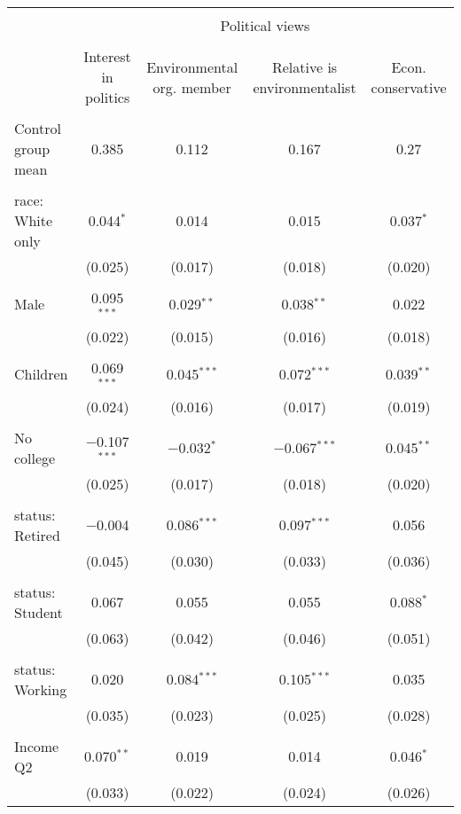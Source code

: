 
\begin{tabular}{@{\extracolsep{5pt}}lcccc} 
\\[-1.8ex]\hline 
\hline \\[-1.8ex] 
 & \multicolumn{4}{c}{Political views} \\ 
\cline{2-5} 
\\[-1.8ex] & Interest in politics & Environmental org. member & Relative is environmentalist & Econ. conservative \\ 
\hline \\[-1.8ex] 
 Control group mean & 0.385 & 0.112 & 0.167 & 0.27  \\ \hline \\[-1.8ex] race: White only & 0.044$^{*}$ & 0.014 & 0.015 & 0.037$^{*}$ \\ 
  & (0.025) & (0.017) & (0.018) & (0.020) \\ 
  & & & & \\ 
 Male & 0.095$^{***}$ & 0.029$^{**}$ & 0.038$^{**}$ & 0.022 \\ 
  & (0.022) & (0.015) & (0.016) & (0.018) \\ 
  & & & & \\ 
 Children & 0.069$^{***}$ & 0.045$^{***}$ & 0.072$^{***}$ & 0.039$^{**}$ \\ 
  & (0.024) & (0.016) & (0.017) & (0.019) \\ 
  & & & & \\ 
 No college & $-$0.107$^{***}$ & $-$0.032$^{*}$ & $-$0.067$^{***}$ & 0.045$^{**}$ \\ 
  & (0.025) & (0.017) & (0.018) & (0.020) \\ 
  & & & & \\ 
 status: Retired & $-$0.004 & 0.086$^{***}$ & 0.097$^{***}$ & 0.056 \\ 
  & (0.045) & (0.030) & (0.033) & (0.036) \\ 
  & & & & \\ 
 status: Student & 0.067 & 0.055 & 0.055 & 0.088$^{*}$ \\ 
  & (0.063) & (0.042) & (0.046) & (0.051) \\ 
  & & & & \\ 
 status: Working & 0.020 & 0.084$^{***}$ & 0.105$^{***}$ & 0.035 \\ 
  & (0.035) & (0.023) & (0.025) & (0.028) \\ 
  & & & & \\ 
 Income Q2 & 0.070$^{**}$ & 0.019 & 0.014 & 0.046$^{*}$ \\ 
  & (0.033) & (0.022) & (0.024) & (0.026) \\ 

\end{tabular}
